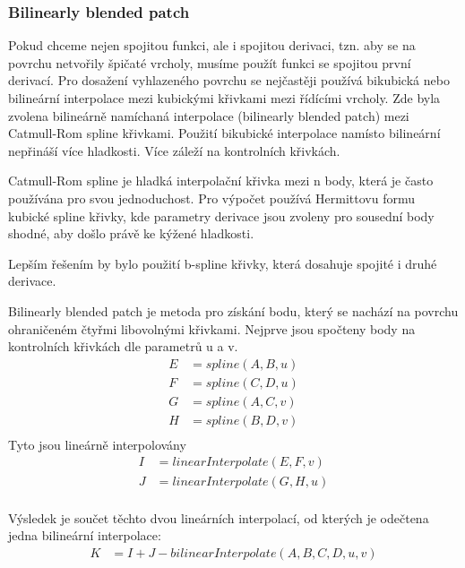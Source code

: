 \documentclass[11pt]{article}
\begin{document}
\subsubsection{Bilinearly blended patch}
Pokud chceme nejen spojitou funkci, ale i spojitou derivaci, tzn. aby se na
povrchu netvořily špičaté vrcholy, musíme použít funkci se spojitou první
derivací. Pro dosažení vyhlazeného povrchu se nejčastěji používá bikubická nebo
bilineární interpolace mezi kubickými křivkami mezi řídícími vrcholy. Zde byla
zvolena bilineárně namíchaná interpolace (bilinearly blended patch) mezi
Catmull-Rom spline křivkami. Použití bikubické interpolace namísto bilineární
nepřináší více hladkosti. Více záleží na kontrolních křivkách.

Catmull-Rom spline je hladká interpolační křivka mezi n body, která je často
používána pro svou jednoduchost. Pro výpočet používá Hermittovu formu kubické spline křivky, kde parametry derivace jsou zvoleny pro sousední body shodné, aby došlo právě ke kýžené hladkosti.

Lepším řešením by bylo použití b-spline křivky, která dosahuje spojité i druhé derivace.

Bilinearly blended patch je metoda pro získání bodu, který se nachází na povrchu ohraničeném čtyřmi libovolnými křivkami.
Nejprve jsou spočteny body na kontrolních křivkách dle parametrů u a v. 
\begin{align*}
E &= spline(A, B, u) \\
F &= spline(C, D, u) \\
G &= spline(A, C, v) \\
H &= spline(B, D, v) \\
\end{align*}
Tyto jsou lineárně interpolovány
\begin{align*}
I &= linearInterpolate(E, F, v) \\
J &= linearInterpolate(G, H, u) \\
\end{align*}

Výsledek je součet těchto dvou lineárních interpolací, od kterých je odečtena jedna bilineární interpolace:
\begin{align*}
K &= I + J - bilinearInterpolate(A, B, C, D, u, v) \\
\end{align*}
\end{document}
